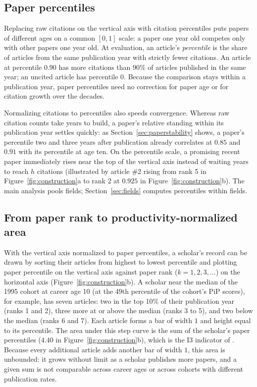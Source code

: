 \documentclass[11pt]{article}
\begin{document}
\subsection{Paper percentiles}
Replacing raw citations on the vertical axis with citation percentiles puts papers of different ages on a common
$[0, 1]$ scale: a paper one year old competes only with other papers one year old. At evaluation, an article's
\emph{percentile} is the share of articles from the same publication year with strictly fewer citations. An article at
percentile $0.90$ has more citations than 90\% of articles published in the same year; an uncited article has percentile
$0$. Because the comparison stays within a publication year, paper percentiles need no correction for paper age or for
citation growth over the decades.

Normalizing citations to percentiles also speeds convergence. Whereas raw citation counts take years to build, a paper's
relative standing within its publication year settles quickly: as Section~\ref{sec:paperstability} shows, a paper's
percentile two and three years after publication already correlates at $0.85$ and $0.91$ with its percentile at age ten.
On the percentile scale, a promising recent paper immediately rises near the top of the vertical axis instead of waiting
years to reach $h$ citations (illustrated by article \#2 rising from rank 5 in Figure~\ref{fig:construction}a to rank 2
at $0.925$ in Figure~\ref{fig:construction}b). The main analysis pools fields; Section~\ref{sec:fields} computes
percentiles within fields.

\subsection{From paper rank to productivity-normalized area}
\label{sec:auc}
With the vertical axis normalized to paper percentiles, a scholar's record can be drawn by sorting their articles from
highest to lowest percentile and plotting paper percentile on the vertical axis against paper rank
($k = 1, 2, 3, \ldots$) on the horizontal axis (Figure~\ref{fig:construction}b). A scholar near the median of the 1995
cohort at career age 10 (at the 49th percentile of the cohort's PiP scores), for example, has seven articles: two in the top 10\% of their publication year (ranks 1 and 2), three more
at or above the median (ranks 3 to 5), and two below the median (ranks 6 and 7). Each article forms a bar of width $1$
and height equal to its percentile. The area under this step curve is the sum of the scholar's paper percentiles ($4.40$
in Figure~\ref{fig:construction}b), which is the I3 indicator of \citet{leydesdorff2011integrated}. Because every
additional article adds another bar of width $1$, this area is unbounded: it grows without limit as a scholar publishes
more papers, and a given sum is not comparable across career ages or across cohorts with different publication rates.
\end{document}
